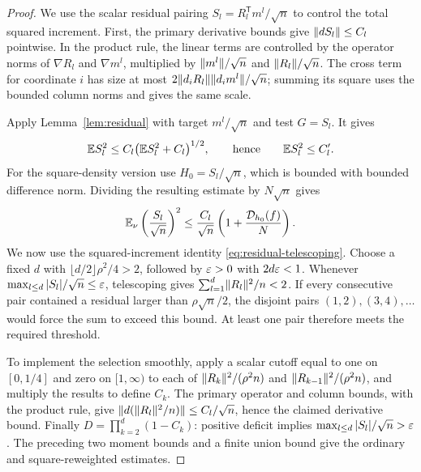 \begin{proof}
We use the scalar residual pairing $S_l=R_l^{\mathsf T}m^l/\sqrt n$ to
control the total squared increment. First, the primary derivative bounds
give $\lVert dS_l\rVert\le C_l$ pointwise. In the product rule, the linear
terms are controlled by the operator norms of $\nabla R_l$ and
$\nabla m^l$, multiplied by $\lVert m^l\rVert/\sqrt n$ and
$\lVert R_l\rVert/\sqrt n$. The cross term for coordinate $i$ has size at most
$2\lVert d_i R_l\rVert\lVert d_i m^l\rVert/\sqrt n$; summing its square uses the
bounded column norms and gives the same scale.

Apply Lemma~\ref{lem:residual} with target $m^l/\sqrt n$ and test $G=S_l$.
It gives
\[
 \mathbb E S_l^2\le C_l\bigl(\mathbb E S_l^2+C_l\bigr)^{1/2},
 \qquad\text{hence}\qquad \mathbb E S_l^2\le C_l'.
\]
For the square-density version use $H_0=S_l/\sqrt n$, which is bounded with
bounded difference norm. Dividing the resulting estimate by $N\sqrt n$
gives
\begin{equation}\label{eq:weighted-S}
 \mathbb E_\nu\left(\frac{S_l}{\sqrt n}\right)^2
 \le\frac{C_l}{\sqrt n}\left(1+\frac{\mathcal D_{h_0}(f)}{N}\right).
\end{equation}
We now use the squared-increment identity
\eqref{eq:residual-telescoping}. Choose a fixed $d$ with
$\lfloor d/2\rfloor\rho^2/4>2$, followed by $\varepsilon>0$ with $2d\varepsilon<1$.
Whenever $\max_{l\le d}|S_l|/\sqrt n\le\varepsilon$, telescoping gives
$\sum_{l=1}^d\lVert R_l\rVert^2/n<2$. If every consecutive pair contained a
residual larger than $\rho\sqrt n/2$, the disjoint pairs
$(1,2),(3,4),\ldots$ would force the sum to exceed this bound. At least
one pair therefore meets the required threshold.

To implement the selection smoothly, apply a scalar cutoff equal to one
on $[0,1/4]$ and zero on $[1,\infty)$ to each of
$\lVert R_k\rVert^2/(\rho^2n)$ and $\lVert R_{k-1}\rVert^2/(\rho^2n)$, and multiply
the results to define $C_k$. The primary operator and column bounds,
with the product rule, give
$\lVert d(\lVert R_l\rVert^2/n)\rVert\le C_l/\sqrt n$, hence the claimed derivative
bound. Finally $D=\prod_{k=2}^d(1-C_k)$: positive deficit implies
$\max_{l\le d}|S_l|/\sqrt n>\varepsilon$. The preceding two moment bounds and
a finite union bound give the ordinary and square-reweighted estimates.
\end{proof}

